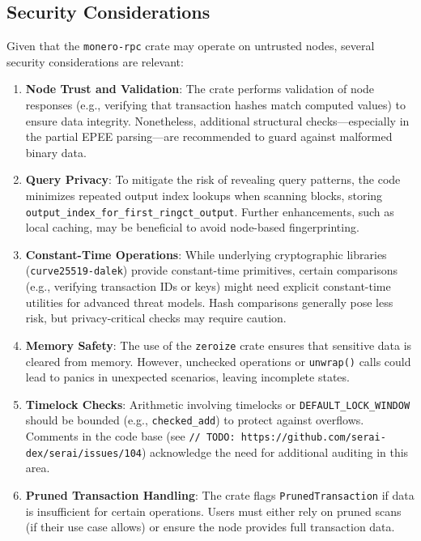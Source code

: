 \documentclass[12pt,a4paper]{article}
\begin{document}
\subsection{Security Considerations}
\label{sec:monero-rpc-security}

Given that the \texttt{monero-rpc} crate may operate on untrusted nodes, several security
considerations are relevant:

\begin{enumerate}
    \item \textbf{Node Trust and Validation}: The crate performs validation of node responses (e.g.,
    verifying that transaction hashes match computed values) to ensure data integrity. Nonetheless,
    additional structural checks—especially in the partial EPEE parsing—are recommended to guard
    against malformed binary data.

    \item \textbf{Query Privacy}: To mitigate the risk of revealing query patterns, the code
    minimizes repeated output index lookups when scanning blocks, storing
    \texttt{output\_index\_for\_first\_ringct\_output}. Further enhancements, such as local
    caching, may be beneficial to avoid node-based fingerprinting.

    \item \textbf{Constant-Time Operations}: While underlying cryptographic libraries (\texttt{curve25519-dalek})
    provide constant-time primitives, certain comparisons (e.g., verifying transaction IDs or keys)
    might need explicit constant-time utilities for advanced threat models. Hash comparisons
    generally pose less risk, but privacy-critical checks may require caution.

    \item \textbf{Memory Safety}: The use of the \texttt{zeroize} crate ensures that sensitive data
    is cleared from memory. However, unchecked operations or \texttt{unwrap()} calls could lead to
    panics in unexpected scenarios, leaving incomplete states.

    \item \textbf{Timelock Checks}: Arithmetic involving timelocks or
    \texttt{DEFAULT\_LOCK\_WINDOW} should be bounded (e.g., \texttt{checked\_add}) to protect
    against overflows. Comments in the code base (see \texttt{// TODO: https://github.com/serai-dex/serai/issues/104})
    acknowledge the need for additional auditing in this area.

    \item \textbf{Pruned Transaction Handling}: The crate flags \texttt{PrunedTransaction} if data is
    insufficient for certain operations. Users must either rely on pruned scans (if their use case
    allows) or ensure the node provides full transaction data.
\end{enumerate}
\end{document}

